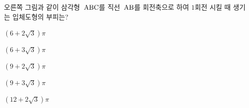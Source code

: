 \noindent\begin{minipage}[t]{0.58\linewidth}\vspace{0pt}\raggedright 오른쪽 그림과 같이 삼각형~$\mathrm{ABC}$를 직선~$\mathrm{AB}$를 회전축으로 하여 $1$회전 시킬 때 생기는 입체도형의 부피는?\end{minipage}\hfill\begin{minipage}[t]{0.4\linewidth}\vspace{0pt}\centering \resizebox{\ifdim\width>\linewidth\linewidth\else\width\fi}{!}{}\end{minipage}\par
\begin{choicesii}{\rule[-3ex]{0pt}{8ex}$(6+2\sqrt{3})\pi$}{\rule[-3ex]{0pt}{8ex}$(6+3\sqrt{3})\pi$}{\rule[-3ex]{0pt}{8ex}$(9+2\sqrt{3})\pi$}{\rule[-3ex]{0pt}{8ex}$(9+3\sqrt{3})\pi$}{\rule[-3ex]{0pt}{8ex}$(12+2\sqrt{3})\pi$}\end{choicesii}
